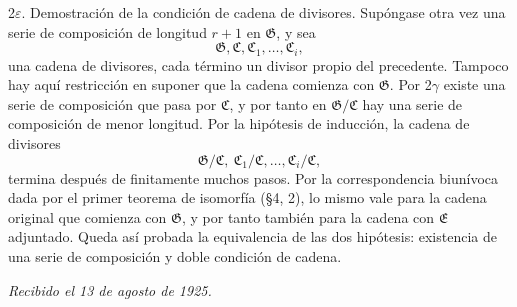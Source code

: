 \documentclass[11pt]{article}
\providecommand{\mC}{\mathfrak{C}}
\providecommand{\mE}{\mathfrak{E}}
\providecommand{\mG}{\mathfrak{G}}
\begin{document}
2$\varepsilon$. Demostración de la condición de cadena de divisores. Supóngase otra vez una serie de composición de longitud $r+1$ en $\mG$, y sea
\[
        \mG,\mC,\mC_1,\ldots,\mC_i,
\]
una cadena de divisores, cada término un divisor propio del precedente. Tampoco hay aquí restricción en suponer que la cadena comienza con $\mG$. Por 2$\gamma$ existe una serie de composición que pasa por $\mC$, y por tanto en $\mG/\mC$ hay una serie de composición de menor longitud. Por la hipótesis de inducción, la cadena de divisores
\[
        \mG/\mC,\ \mC_1/\mC,\ldots,\mC_i/\mC,
\]
termina después de finitamente muchos pasos. Por la correspondencia biunívoca dada por el primer teorema de isomorfía (§4, 2), lo mismo vale para la cadena original que comienza con $\mG$, y por tanto también para la cadena con $\mE$ adjuntado. Queda así probada la equivalencia de las dos hipótesis: existencia de una serie de composición y doble condición de cadena.

\emph{Recibido el 13 de agosto de 1925.}
\end{document}
